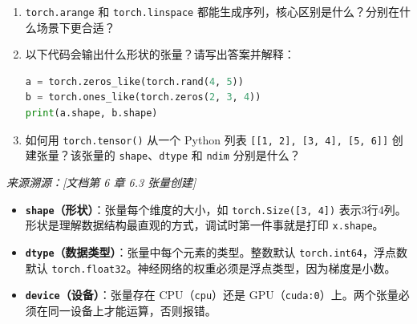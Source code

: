 \documentclass[a4paper,11pt]{ctexart}
\begin{document}
\begin{problembox}
\begin{enumerate}[(1)]
        \item \texttt{torch.arange} 和 \texttt{torch.linspace} 都能生成序列，核心区别是什么？分别在什么场景下更合适？

        \item 以下代码会输出什么形状的张量？请写出答案并解释：
        \begin{lstlisting}[language=Python]
a = torch.zeros_like(torch.rand(4, 5))
b = torch.ones_like(torch.zeros(2, 3, 4))
print(a.shape, b.shape)
        \end{lstlisting}

        \item 如何用 \texttt{torch.tensor()} 从一个 Python 列表 \texttt{[[1, 2], [3, 4], [5, 6]]} 创建张量？该张量的 \texttt{shape}、\texttt{dtype} 和 \texttt{ndim} 分别是什么？
    \end{enumerate}

    \vspace{0.2cm}
    {\color{gray}\small\textit{来源溯源：[文档第 6 章 6.3 张量创建]}}
\end{problembox}

\begin{beginnerbox}
    \begin{itemize}
        \item \textbf{\texttt{shape}（形状）}：张量每个维度的大小，如 \texttt{torch.Size([3, 4])} 表示3行4列。形状是理解数据结构最直观的方式，调试时第一件事就是打印 \texttt{x.shape}。
        \item \textbf{\texttt{dtype}（数据类型）}：张量中每个元素的类型。整数默认 \texttt{torch.int64}，浮点数默认 \texttt{torch.float32}。神经网络的权重必须是浮点类型，因为梯度是小数。
        \item \textbf{\texttt{device}（设备）}：张量存在 CPU（\texttt{cpu}）还是 GPU（\texttt{cuda:0}）上。两个张量必须在同一设备上才能运算，否则报错。
    \end{itemize}
\end{beginnerbox}
\end{document}

